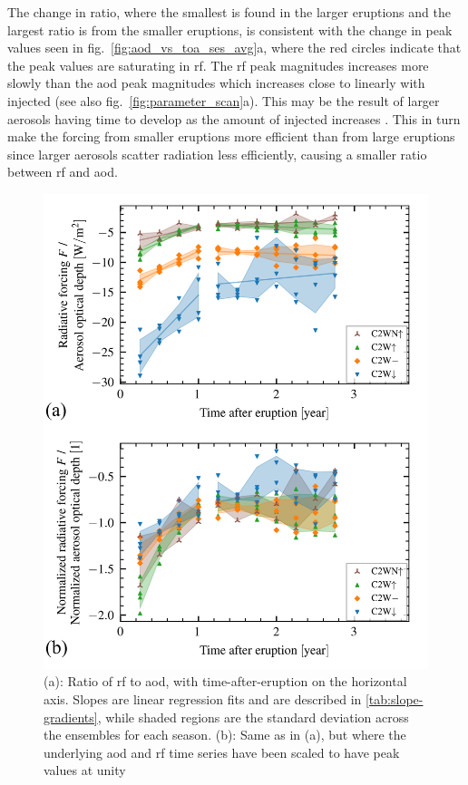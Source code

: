 \documentclass{ametsocV6.1}
\begin{document}
The change in ratio, where the smallest is found in the larger eruptions and the largest
ratio is from the smaller eruptions, is consistent with the change in peak values seen
in fig.~\ref{fig:aod_vs_toa_ses_avg}a, where the red circles indicate that the peak
values are saturating in \gls{rf}. The \gls{rf} peak magnitudes increases more slowly
than the \gls{aod} peak magnitudes which increases close to linearly with injected
 (see also fig.~\ref{fig:parameter_scan}a). This may be the result of larger
aerosols having time to develop as the amount of injected  increases
\citep{niemeier2015,marshall2019}. This in turn make the forcing from smaller eruptions
more efficient than from large eruptions since larger aerosols scatter radiation less
efficiently, causing a smaller ratio between \gls{rf} and \gls{aod}.

\begin{figure}
  \centering
  \includegraphics[width=0.95\linewidth]{figures/aod_vs_toa_loop.png}

  \caption{(a): Ratio of \gls{rf} to \gls{aod}, with time-after-eruption on the horizontal
    axis. Slopes are linear regression fits and are described in \ref{tab:slope-gradients},
    while shaded regions are the standard deviation across the ensembles for each season.
    (b): Same as in (a), but where the underlying \gls{aod} and \gls{rf} time series have
    been scaled to have peak values at unity}\label{fig:aod_vs_toa_avg_loop_ratios}%
\end{figure}
\end{document}
